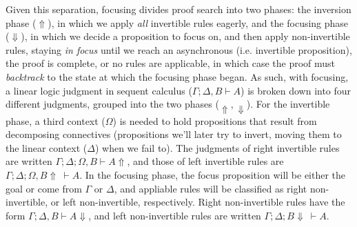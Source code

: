 \documentclass{llncs}
\begin{document}
Given this separation, focusing divides proof search into two
phases: %
the inversion phase ($\Uparrow$), in which we apply \emph{all} invertible rules
eagerly, and the focusing phase  ($\Downarrow$), in which we decide a proposition
to focus on, and then apply non-invertible rules, staying \emph{in focus}
until we reach an asynchronous (i.e. invertible proposition), the
proof is complete, or no rules are applicable, in which case the proof must
\emph{backtrack} to the state at which the focusing phase began.
As such, with focusing, a linear logic judgment in sequent calculus ($\Gamma; \Delta, B
\vdash A$) is broken down into four different judgments, grouped into the two
phases ($\Uparrow, \Downarrow$). For the invertible phase, a third %
context ($\Omega$) is needed to hold propositions that result from
decomposing connectives (propositions we'll later try to invert, moving them to
the linear context ($\Delta$) when we fail to). The judgments of right
invertible rules are written $\Gamma; \Delta; \Omega,B \vdash A \Uparrow$, and
those of left invertible rules are $\Gamma; \Delta; \Omega,B \Uparrow\ \vdash A$.
In the focusing phase, the focus proposition will be either the goal or come
from $\Gamma$ or $\Delta$, and appliable rules will be classified as right
non-invertible, or left non-invertible, respectively. Right non-invertible
rules have the form $\Gamma;\Delta,B \vdash A \Downarrow$, and left
non-invertible rules are written $\Gamma;\Delta; B \Downarrow\ \vdash A$.


%
\end{document}
